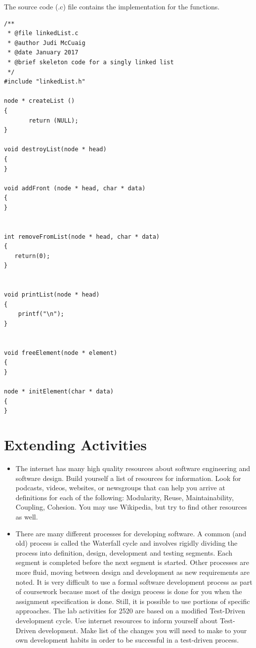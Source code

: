 \clearpage
The source code (.c) file contains the implementation for the functions.
\begin{lstlisting}
/**
 * @file linkedList.c
 * @author Judi McCuaig
 * @date January 2017
 * @brief skeleton code for a singly linked list
 */
#include "linkedList.h"

node * createList ()
{
       return (NULL);
}

void destroyList(node * head)
{    
}

void addFront (node * head, char * data)
{    
}


int removeFromList(node * head, char * data)
{
   return(0); 
}


void printList(node * head)
{
    printf("\n");
}


void freeElement(node * element)
{
}

node * initElement(char * data)
{
}
\end{lstlisting}

\section{Extending Activities}

\begin{itemize}

\item The internet has many high quality resources about software engineering and software design.  Build yourself a list of resources for information.  Look for podcasts, videos, websites, or newsgroups that can help you arrive at definitions for each of the following:   Modularity,   Reuse, Maintainability,   Coupling,   Cohesion.     You may use Wikipedia, but try to find other resources as well.



\item There are many different processes for developing software.  A common (and old) process is called the Waterfall cycle and involves rigidly dividing the process into definition, design, development and testing segments.  Each segment is completed before the next segment is started.  Other processes are more fluid, moving between design and development as new requirements are noted.
 It is very difficult to use a formal software development process as part of coursework because most of the design process is done for you when the assignment specification is done.   Still, it is possible to use portions of specific approaches.   The lab activities for 2520 are based on a modified Test-Driven development cycle.    Use internet resources to inform yourself about Test-Driven development.  Make list of the changes you will need to make to your own development habits in order to be successful in a test-driven process.
\end{itemize}

